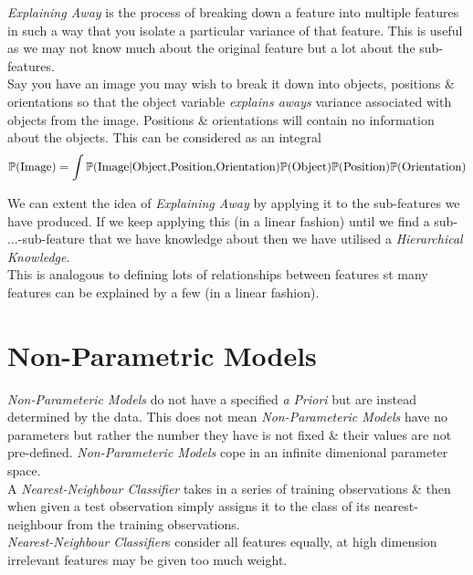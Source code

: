 \documentclass[11pt,a4paper]{article}
\begin{document}
\textit{Explaining Away} is the process of breaking down a feature into multiple features in such a way that you isolate a particular variance of that feature. This is useful as we may not know much about the original feature but a lot about the sub-features.\\

Say you have an image you may wish to break it down into objects, positions \& orientations so that the object variable \textit{explains aways} variance associated with objects from the image. Positions \& orientations will contain no information about the objects. This can be considered as an integral
$$\mathbb{P}(\text{Image})=\int\mathbb{P}(\text{Image}|\text{Object,Position,Orientation})\mathbb{P}(\text{Object})\mathbb{P}(\text{Position})\mathbb{P}(\text{Orientation})$$

We can extent the idea of \textit{Explaining Away} by applying it to the sub-features we have produced. If we keep applying this (in a linear fashion) until we find a sub-$\dots$-sub-feature that we have knowledge about then we have utilised a \textit{Hierarchical Knowledge}.\\
This is analogous to defining lots of relationships between features st many features can be explained by a few (in a linear fashion).\\

\section{Non-Parametric Models}

\textit{Non-Parameteric Models} do not have a specified \textit{a Priori} but are instead determined by the data. This does not mean \textit{Non-Parameteric Models} have no parameters but rather the number they have is not fixed \& their values are not pre-defined. \textit{Non-Parameteric Models} cope in an infinite dimenional parameter space.\\

A \textit{Nearest-Neighbour Classifier} takes in a series of training observations \& then when given a test observation simply assigns it to the class of its nearest-neighbour from the training observations.\\
\nb \textit{Nearest-Neighbour Classifier}s consider all features equally, at high dimension irrelevant features may be given too much weight.\\
\end{document}
